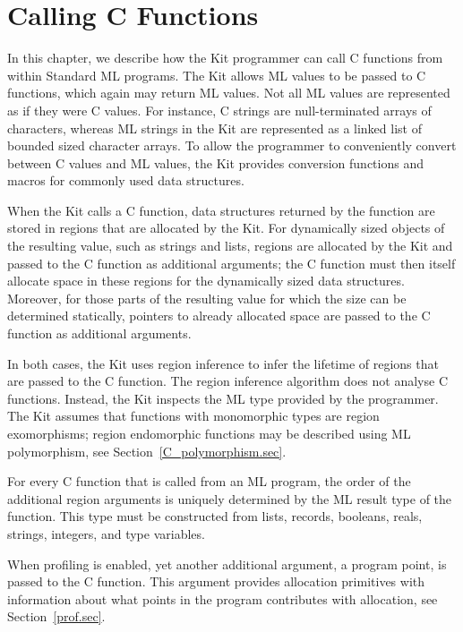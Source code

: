\documentclass[12pt]{book}
\begin{document}
\chapter{Calling C Functions}
\label{ccall.sec}

In this chapter, we describe how the Kit programmer can call C
functions from within Standard ML programs.  The Kit allows ML values
to be passed to C functions, which again may return ML values. Not all
ML values are represented as if they were C values. For instance, C
strings are null-terminated arrays of characters, whereas ML strings
in the Kit are represented as a linked list of bounded sized character
arrays. To allow the programmer to conveniently convert between C
values and ML values, the Kit provides conversion functions and macros
for commonly used data structures.

When the Kit calls a C function, data structures returned by the
function are stored in regions that are allocated by the Kit. For
dynamically sized objects of the resulting value, such as strings and
lists, regions are allocated by the Kit and passed to the C function
as additional arguments; the C function must then itself allocate
space in these regions for the dynamically sized data
structures. Moreover, for those parts of the resulting value for which
the size can be determined statically, pointers to already allocated
space are passed to the C function as additional arguments.

In both cases, the Kit uses region inference to infer the lifetime of
regions that are passed to the C function.  The region inference
algorithm does not analyse C functions. Instead, the Kit inspects the
ML type provided by the programmer. The Kit assumes that functions
with monomorphic types are 
%
region exomorphisms;
%
region endomorphic functions may be described using ML polymorphism,
see Section~\ref{C_polymorphism.sec}.

For every C function that is called from an ML program, the order of the
additional region arguments is uniquely determined by the ML result type
of the function.  This type must be constructed from lists, records,
booleans, reals, strings, integers, and type variables.

When profiling is enabled, yet another additional argument, a program
point, is passed to the C function. This argument provides allocation
primitives with information about what points in the program
contributes with allocation, see Section~\ref{prof.sec}.
\end{document}
